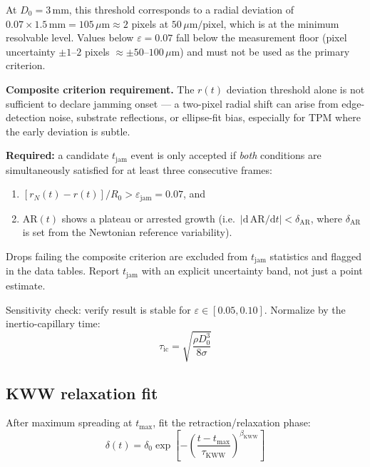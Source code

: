 \documentclass[11pt,letterpaper]{article}
\newcommand{\taukww}{\tau_{\mathrm{KWW}}}
\newcommand{\tauic}{\tau_{\mathrm{ic}}}
\newcommand{\tjam}{t_{\mathrm{jam}}}
\newcommand{\bkww}{\beta_{\mathrm{KWW}}}
\begin{document}
\noindent At $D_0 = 3$\,mm, this threshold corresponds to a radial deviation of
$0.07 \times 1.5\,\mathrm{mm} = 105\,\mu\mathrm{m} \approx 2$ pixels at $50\,\mu\mathrm{m/pixel}$,
which is at the minimum resolvable level. Values below $\varepsilon = 0.07$ fall below the
measurement floor (pixel uncertainty $\pm 1$--$2$ pixels $\approx \pm 50$--$100\,\mu\mathrm{m}$)
and must not be used as the primary criterion.

\begin{cautionbox}
\textbf{Composite criterion requirement.}
The $r(t)$ deviation threshold alone is not sufficient to declare jamming onset --- a
two-pixel radial shift can arise from edge-detection noise, substrate reflections, or
ellipse-fit bias, especially for TPM where the early deviation is subtle.

\noindent \textbf{Required:} a candidate $\tjam$ event is only accepted if \emph{both}
conditions are simultaneously satisfied for at least three consecutive frames:
\begin{enumerate}[noitemsep,topsep=3pt]
  \item $[r_N(t) - r(t)]/R_0 > \varepsilon_\mathrm{jam} = 0.07$, and
  \item $\mathrm{AR}(t)$ shows a plateau or arrested growth
    (i.e.\ $|\mathrm{d}\,\mathrm{AR}/\mathrm{d}t| < \delta_\mathrm{AR}$,
    where $\delta_\mathrm{AR}$ is set from the Newtonian reference variability).
\end{enumerate}
Drops failing the composite criterion are excluded from $\tjam$ statistics and flagged
in the data tables. Report $\tjam$ with an explicit uncertainty band, not just a point
estimate.
\end{cautionbox}

Sensitivity check: verify result is stable for $\varepsilon \in [0.05, 0.10]$.
Normalize by the inertio-capillary time:
\begin{equation}
  \tauic = \sqrt{\frac{\rho D_0^3}{8\sigma}}
\end{equation}

\subsection{KWW relaxation fit}

After maximum spreading at $t_\mathrm{max}$, fit the retraction/relaxation phase:
\begin{equation}
  \delta(t) = \delta_0 \exp\!\left[-\left(\frac{t - t_\mathrm{max}}{\taukww}\right)^{\!\bkww}\right]
  \label{eq:KWW}
\end{equation}
\end{document}
